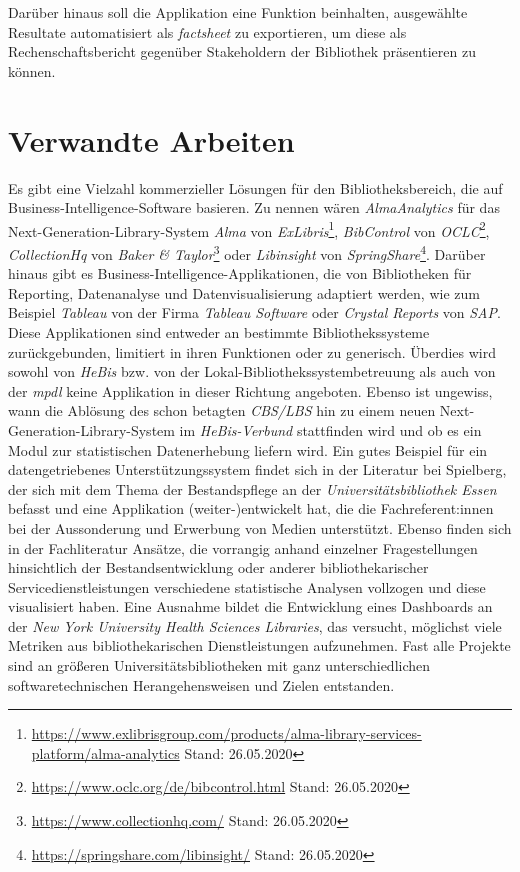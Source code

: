 Darüber hinaus soll die Applikation  eine Funktion beinhalten, ausgewählte
Resultate automatisiert als \textit{factsheet} zu exportieren, um diese
als Rechenschaftsbericht gegenüber Stakeholdern der Bibliothek präsentieren zu können.

\section{Verwandte Arbeiten}
Es gibt eine Vielzahl kommerzieller Lösungen für den Bibliotheksbereich, die auf Business-Intelligence-Software basieren.
Zu nennen wären \textit{AlmaAnalytics} für das
Next-Generation-Library-System \textit{Alma} von \textit{ExLibris}\footnote{\url{https://www.exlibrisgroup.com/products/alma-library-services-platform/alma-analytics}
Stand: 26.05.2020}, \textit{BibControl} von \textit{OCLC}\footnote{\url{https://www.oclc.org/de/bibcontrol.html} Stand: 26.05.2020},
\textit{CollectionHq} von \textit{Baker \& Taylor}\footnote{\url{https://www.collectionhq.com/} Stand: 26.05.2020} oder \textit{Libinsight} von \textit{SpringShare}\footnote{\url{https://springshare.com/libinsight/} Stand: 26.05.2020}.
Darüber hinaus gibt es Business-Intelligence-Applikationen, die von
Bibliotheken für Reporting, Datenanalyse und Datenvisualisierung adaptiert werden,
wie zum Beispiel \textit{Tableau} von der Firma \textit{Tableau Software} oder
\textit{Crystal Reports} von \textit{SAP}.
Diese Applikationen sind entweder
an bestimmte Bibliothekssysteme zurückgebunden, limitiert in ihren
Funktionen\cite{RN47} oder zu generisch.
Überdies wird sowohl von \textit{HeBis} bzw. von der
Lokal-Bibliothekssystembetreuung als auch von der \textit{mpdl} keine Applikation
in dieser Richtung angeboten.
Ebenso ist ungewiss, wann die Ablösung des schon betagten \textit{CBS/LBS} hin zu
einem neuen Next-Generation-Library-System im \textit{HeBis-Verbund} stattfinden wird und ob
es ein Modul zur statistischen Datenerhebung liefern wird.
Ein gutes Beispiel für ein datengetriebenes Unterstützungssystem findet sich in
der Literatur bei Spielberg, der sich mit dem Thema der Bestandspflege an der
\textit{Universitätsbibliothek Essen} befasst und eine Applikation (weiter-)entwickelt hat, die
die Fachreferent:innen bei der Aussonderung und Erwerbung von Medien
unterstützt.\cite{RN48}
Ebenso finden sich in der Fachliteratur Ansätze, die vorrangig anhand einzelner
Fragestellungen hinsichtlich der Bestandsentwicklung\cite{RN28} oder anderer
bibliothekarischer Servicedienstleistungen\cite{RN43,RN41,RN45} verschiedene statistische Analysen
vollzogen und diese visualisiert haben.
Eine Ausnahme bildet die Entwicklung eines Dashboards an der \textit{New York
University Health Sciences Libraries}, das versucht, möglichst viele Metriken
aus bibliothekarischen Dienstleistungen aufzunehmen.\cite{RN34}
Fast alle Projekte sind an größeren
Universitätsbibliotheken mit ganz unterschiedlichen softwaretechnischen
Herangehensweisen\cite{RN31,RN42} und Zielen\cite{RN1} entstanden.

